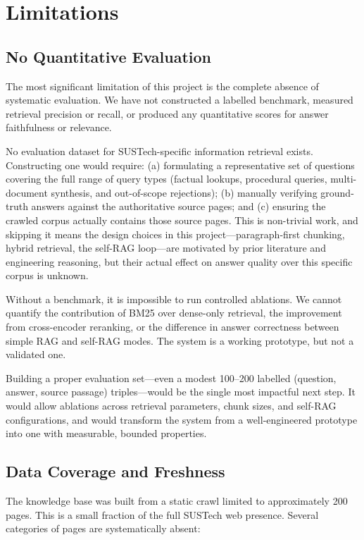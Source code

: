 \chapter{Limitations}\label{ch:limitations}

\section{No Quantitative Evaluation}

The most significant limitation of this project is the complete absence of systematic evaluation. We have not constructed a labelled benchmark, measured retrieval precision or recall, or produced any quantitative scores for answer faithfulness or relevance.

No evaluation dataset for SUSTech-specific information retrieval exists. Constructing one would require: (a) formulating a representative set of questions covering the full range of query types (factual lookups, procedural queries, multi-document synthesis, and out-of-scope rejections); (b) manually verifying ground-truth answers against the authoritative source pages; and (c) ensuring the crawled corpus actually contains those source pages. This is non-trivial work, and skipping it means the design choices in this project---paragraph-first chunking, hybrid retrieval, the self-RAG loop---are motivated by prior literature and engineering reasoning, but their actual effect on answer quality over this specific corpus is unknown.

Without a benchmark, it is impossible to run controlled ablations. We cannot quantify the contribution of BM25 over dense-only retrieval, the improvement from cross-encoder reranking, or the difference in answer correctness between simple RAG and self-RAG modes. The system is a working prototype, but not a validated one.

Building a proper evaluation set---even a modest 100--200 labelled (question, answer, source passage) triples---would be the single most impactful next step. It would allow ablations across retrieval parameters, chunk sizes, and self-RAG configurations, and would transform the system from a well-engineered prototype into one with measurable, bounded properties.

\section{Data Coverage and Freshness}

The knowledge base was built from a static crawl limited to approximately 200 pages. This is a small fraction of the full SUSTech web presence. Several categories of pages are systematically absent:

